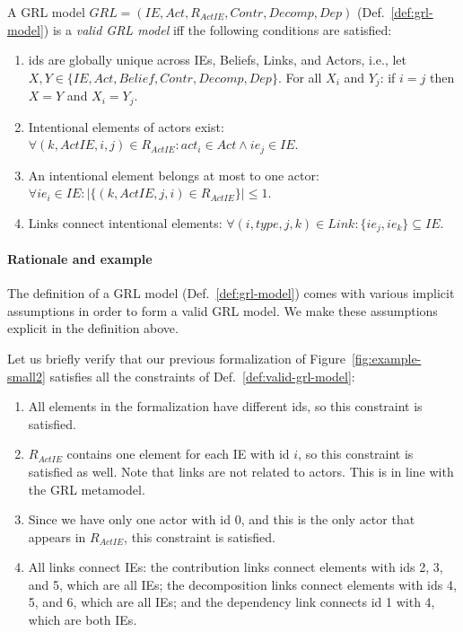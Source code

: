 \begin{definition}
\label{def:valid-grl-model}
A GRL model $GRL=(IE, Act, R_{ActIE}, Contr, Decomp, Dep)$ (Def.~\ref{def:grl-model}) is a \emph{valid GRL model} iff the following conditions are satisfied:
\begin{enumerate}
\item ids are globally unique across IEs, Beliefs, Links, and Actors, i.e., let $X,Y\in \{IE,Act, Belief, Contr, Decomp, Dep\}$. For all $X_i$ and $Y_j$: if $i=j$ then $X=Y$ and $X_i=Y_j$.
\item Intentional elements of actors exist: $\forall (k, ActIE, i,j)\in R_{ActIE}: act_i \in Act \wedge ie_j \in IE$.
\item An intentional element belongs at most to one actor: $\forall ie_i\in IE: |\{(k,ActIE,j,i)\in R_{ActIE}\}| \le 1$.
\item Links connect intentional elements: $\forall (i,type, j,k)\in Link: \{ie_j,ie_k\}\subseteq IE$.
\end{enumerate}
\end{definition}

\paragraph{Rationale and example} The definition of a GRL model (Def.~\ref{def:grl-model}) comes with various implicit assumptions in order to form a valid GRL model. We make these assumptions explicit in the definition above.

Let us briefly verify that our previous formalization of Figure~\ref{fig:example-small2} satisfies all the constraints of Def.~\ref{def:valid-grl-model}:
\begin{enumerate}
\item All elements in the formalization have different ids, so this constraint is satisfied.
\item $R_{ActIE}$ contains one element for each IE with id $i$, so this constraint is satisfied as well. Note that links are not related to actors. This is in line with the GRL metamodel.
\item Since we have only one actor with id 0, and this is the only actor that appears in $R_{ActIE}$, this constraint is satisfied.
\item All links connect IEs: the contribution links connect elements with ids 2, 3, and 5, which are all IEs; the decomposition links connect elements with ids 4, 5, and 6, which are all IEs; and the dependency link connects id 1 with 4, which are both IEs.
\end{enumerate}

